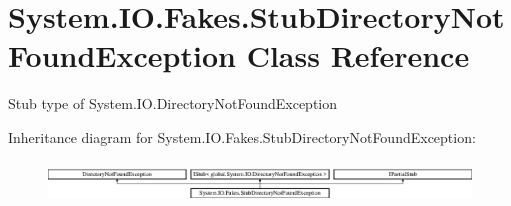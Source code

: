 \hypertarget{class_system_1_1_i_o_1_1_fakes_1_1_stub_directory_not_found_exception}{\section{System.\-I\-O.\-Fakes.\-Stub\-Directory\-Not\-Found\-Exception Class Reference}
\label{class_system_1_1_i_o_1_1_fakes_1_1_stub_directory_not_found_exception}
}


Stub type of System.\-I\-O.\-Directory\-Not\-Found\-Exception 


Inheritance diagram for System.\-I\-O.\-Fakes.\-Stub\-Directory\-Not\-Found\-Exception\-:\begin{figure}[H]
\begin{center}
\leavevmode
\includegraphics[height=1.117764cm]{class_system_1_1_i_o_1_1_fakes_1_1_stub_directory_not_found_exception}
\end{center}
\end{figure}
